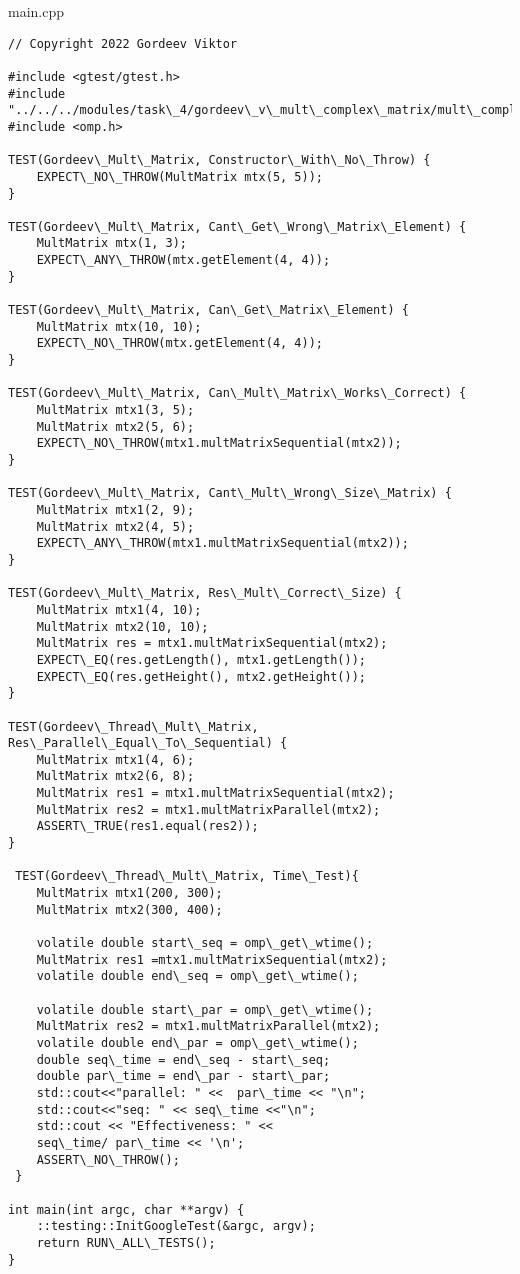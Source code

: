 \documentclass{report}
\begin{document}
main.cpp
\begin{lstlisting}
// Copyright 2022 Gordeev Viktor

#include <gtest/gtest.h>
#include "../../../modules/task\_4/gordeev\_v\_mult\_complex\_matrix/mult\_complex\_matrix.h"
#include <omp.h>

TEST(Gordeev\_Mult\_Matrix, Constructor\_With\_No\_Throw) {
    EXPECT\_NO\_THROW(MultMatrix mtx(5, 5));
}

TEST(Gordeev\_Mult\_Matrix, Cant\_Get\_Wrong\_Matrix\_Element) {
    MultMatrix mtx(1, 3);
    EXPECT\_ANY\_THROW(mtx.getElement(4, 4));
}

TEST(Gordeev\_Mult\_Matrix, Can\_Get\_Matrix\_Element) {
    MultMatrix mtx(10, 10);
    EXPECT\_NO\_THROW(mtx.getElement(4, 4));
}

TEST(Gordeev\_Mult\_Matrix, Can\_Mult\_Matrix\_Works\_Correct) {
    MultMatrix mtx1(3, 5);
    MultMatrix mtx2(5, 6);
    EXPECT\_NO\_THROW(mtx1.multMatrixSequential(mtx2));
}

TEST(Gordeev\_Mult\_Matrix, Cant\_Mult\_Wrong\_Size\_Matrix) {
    MultMatrix mtx1(2, 9);
    MultMatrix mtx2(4, 5);
    EXPECT\_ANY\_THROW(mtx1.multMatrixSequential(mtx2));
}

TEST(Gordeev\_Mult\_Matrix, Res\_Mult\_Correct\_Size) {
    MultMatrix mtx1(4, 10);
    MultMatrix mtx2(10, 10);
    MultMatrix res = mtx1.multMatrixSequential(mtx2);
    EXPECT\_EQ(res.getLength(), mtx1.getLength());
    EXPECT\_EQ(res.getHeight(), mtx2.getHeight());
}

TEST(Gordeev\_Thread\_Mult\_Matrix, Res\_Parallel\_Equal\_To\_Sequential) {
    MultMatrix mtx1(4, 6);
    MultMatrix mtx2(6, 8);
    MultMatrix res1 = mtx1.multMatrixSequential(mtx2);
    MultMatrix res2 = mtx1.multMatrixParallel(mtx2);
    ASSERT\_TRUE(res1.equal(res2));
}

 TEST(Gordeev\_Thread\_Mult\_Matrix, Time\_Test){
    MultMatrix mtx1(200, 300);
    MultMatrix mtx2(300, 400);

    volatile double start\_seq = omp\_get\_wtime();
    MultMatrix res1 =mtx1.multMatrixSequential(mtx2);
    volatile double end\_seq = omp\_get\_wtime();

    volatile double start\_par = omp\_get\_wtime();
    MultMatrix res2 = mtx1.multMatrixParallel(mtx2);
    volatile double end\_par = omp\_get\_wtime();
    double seq\_time = end\_seq - start\_seq;
    double par\_time = end\_par - start\_par;
    std::cout<<"parallel: " <<  par\_time << "\n";
    std::cout<<"seq: " << seq\_time <<"\n";
    std::cout << "Effectiveness: " <<
    seq\_time/ par\_time << '\n';
    ASSERT\_NO\_THROW();
 }

int main(int argc, char **argv) {
    ::testing::InitGoogleTest(&argc, argv);
    return RUN\_ALL\_TESTS();
}

\end{lstlisting}
\end{document}
